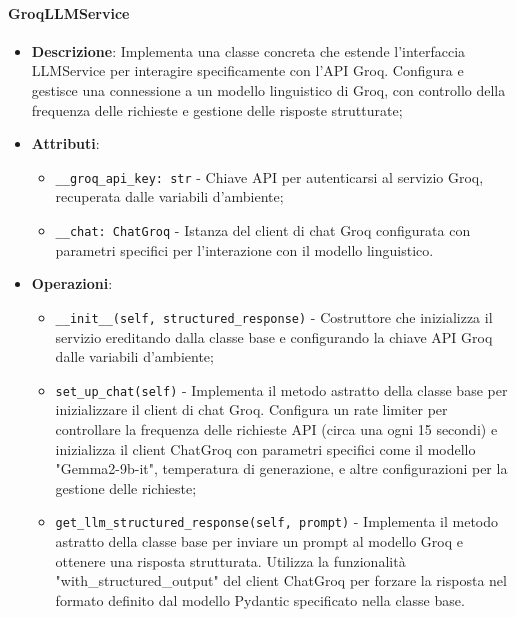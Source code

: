 \documentclass[10pt]{article}
\begin{document}
    \paragraph{GroqLLMService}
    \begin{itemize} 
    \item \textbf{Descrizione}: Implementa una classe concreta che estende l'interfaccia LLMService per interagire specificamente con l'API Groq. Configura e gestisce una connessione a un modello linguistico di Groq, con controllo della frequenza delle richieste e gestione delle risposte strutturate;
    \item \textbf{Attributi}:
    \begin{itemize}
        \item \texttt{\_\_groq\_api\_key: str} - Chiave API per autenticarsi al servizio Groq, recuperata dalle variabili d'ambiente;
        \item \texttt{\_\_chat: ChatGroq} - Istanza del client di chat Groq configurata con parametri specifici per l'interazione con il modello linguistico.
    \end{itemize}
    
    \item \textbf{Operazioni}:
    \begin{itemize}
        \item \texttt{\_\_init\_\_(self, structured\_response)} - Costruttore che inizializza il servizio ereditando dalla classe base e configurando la chiave API Groq dalle variabili d'ambiente;
        
        \item \texttt{set\_up\_chat(self)} - Implementa il metodo astratto della classe base per inizializzare il client di chat Groq. Configura un rate limiter per controllare la frequenza delle richieste API (circa una ogni 15 secondi) e inizializza il client ChatGroq con parametri specifici come il modello "Gemma2-9b-it", temperatura di generazione, e altre configurazioni per la gestione delle richieste;
        
        \item \texttt{get\_llm\_structured\_response(self, prompt)} - Implementa il metodo astratto della classe base per inviare un prompt al modello Groq e ottenere una risposta strutturata. Utilizza la funzionalità "with\_structured\_output" del client ChatGroq per forzare la risposta nel formato definito dal modello Pydantic specificato nella classe base.
    \end{itemize}
    \end{itemize}
\end{document}

